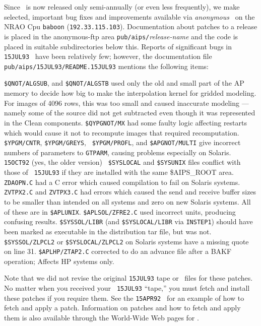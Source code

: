Since \AIPS\ is now released only semi-annually (or even less
frequently), we make selected, important bug fixes and improvements
available via {\it anonymous} \ftp\ on the NRAO Cpu {\tt baboon}
({\tt 192.33.115.103}).  Documentation about patches to a release is
placed in the anonymous-ftp area {\tt pub/aips/}{\it release-name} and
the code is placed in suitable subdirectories below this.  Reports of
significant bugs in {\tt 15JUL93} \AIPS\ have been relatively few;
however, the documentation file {\tt pub/aips/15JUL93/README.15JUL93}
mentions the following items:
\begin{description}
 {\tt \$QNOT/ALGSUB}, and {\tt \$QNOT/ALGSTB} used only the
    old and small part of the AP memory to decide how big to make the
    interpolation kernel for gridded modeling.  For images of 4096
    rows, this was too small and caused inaccurate modeling --- namely
    some of the source did not get subtracted even though it was
    represented in the Clean components.  {\tt \$QYPGNOT/MX} had some
    faulty logic affecting restarts which would cause it not to
    recompute images that required recomputation.
 {\tt \$YPGM/CNTR}, {\tt \$YPGM/GREYS}, {\tt
    \$YPGM/PROFL}, and {\tt \$APGNOT/MULTI} give incorrect numbers of
    parameters to {\tt GTPARM}, causing problems especially on
    Solaris.
 {\tt 15OCT92} (yes, the older version) {\tt
    \$SYSLOCAL} and {\tt \$SYSUNIX} files conflict with those of {\tt
    15JUL93} if they are installed with the same {\$AIPS\_ROOT} area.
 {\tt ZDAOPN.C} had a C error which caused compilation
    to fail on Solaris systems.  {\tt ZVTPX2.C} and {\tt ZVTPX3.C} had
    errors which caused the send and receive buffer sizes to be
    smaller than intended on all systems and zero on new Solaris
    systems.  All of these are in {\tt \$APLUNIX}.
 {\tt \$APLSOL/ZFRE2.C} used incorrect units,
    producing confusing results.
 {\tt \$SYSSOL/LIBR} (and {\tt \$SYSLOCAL/LIBR} via
    {\tt INSTEP1}) should have been marked as executable in the
    distribution tar file, but was not.
 {\tt \$SYSSOL/ZLPCL2} or {\tt \$SYSLOCAL/ZLPCL2} on
    Solaris systems have a missing quote on line 31.
 {\tt \$APLHP/ZTAP2.C} corrected to do an advance file
    after a BAKF operation; Affects HP systems only.
\end{description}
Note that we did not revise the original {\tt 15JUL93} tape or \tar\
files for these patches.  No matter when you received your {\tt
15JUL93} ``tape,'' you must fetch and install these patches if you
require them.  See the {\tt 15APR92} \AIPSLETTER\ for an example of
how to fetch and apply a patch.  Information on patches and how to
fetch and apply them is also available through the World-Wide Web
pages for \AIPS.

